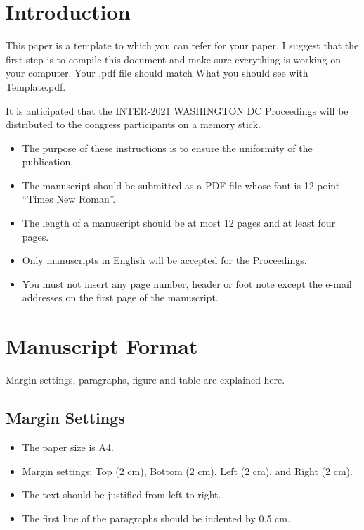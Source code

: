 \section{Introduction}

\noindent
This paper is a template to which you can refer for your paper.  I suggest that the first step is to compile this document and make sure everything is working on your computer.  Your .pdf file should match What you should see with Template.pdf. 

It is anticipated that the INTER-2021 WASHINGTON DC Proceedings will be distributed to the congress participants on a memory stick. 

\begin{itemize}[itemsep=5pt]
\item The purpose of these instructions is to ensure the uniformity of the publication. 
\item The manuscript should be submitted as a PDF file whose font is 12-point ``Times New Roman''.
\item The length of a manuscript should be at most 12 pages and at least four pages. 
\item Only manuscripts in English will be accepted for the Proceedings. 
\item You must not insert any page number, header or foot note except the e-mail addresses on the first page of the manuscript.
\end{itemize}

\clearpage
\section{Manuscript Format}

\noindent
Margin settings, paragraphs, figure and table are explained here. 

\subsection{Margin Settings}

\begin{itemize}[noitemsep]
\item The paper size is A4.
\item Margin settings: Top (2 cm), Bottom (2 cm), Left (2 cm), and Right (2 cm).
\item The text should be justified from left to right.
\item The first line of the paragraphs should be indented by 0.5 cm. 
\end{itemize}

